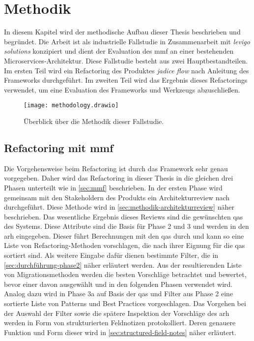 \chapter{Methodik}
\label{chap:methodik}

In diesem Kapitel wird der methodische Aufbau dieser Thesis beschrieben und begründet.
Die Arbeit ist als industrielle Fallstudie in Zusammenarbeit mit \emph{levigo solutions} konzipiert und dient der Evaluation des \gls{mmf} an einer bestehenden Microservices-Architektur.
Diese Fallstudie besteht aus zwei Hauptbestandteilen.
Im ersten Teil wird ein Refactoring des Produktes \emph{jadice flow} nach Anleitung des Frameworks durchgeführt.
Im zweiten Teil wird das Ergebnis dieses Refactorings verwendet, um eine Evaluation des Frameworks und Werkzeugs abzuschließen.

\begin{figure}[!ht]
	\centering
	\texttt{[image: methodology.drawio]}
	\caption[Überblick über die Methodik dieser Fallstudie]{
		Überblick über die Methodik dieser Fallstudie.
	}
	\label{fig:methodology}
\end{figure}

\section{Refactoring mit \gls{mmf}}

Die Vorgehensweise beim Refactoring ist durch das Framework sehr genau vorgegeben.
Daher wird das Refactoring in dieser Thesis in die gleichen drei Phasen unterteilt wie in \cref{sec:mmf} beschrieben.
In der ersten Phase wird gemeinsam mit den Stakeholdern des Produkts ein Architekturreview nach  durchgeführt.
Diese Methode wird in \cref{sec:methodik-architekturreview} näher beschrieben.
Das wesentliche Ergebnis dieses Reviews sind die gewünschten \glspl{qa} des Systems.
Diese Attribute sind die Basis für Phase 2 und 3 und werden in den \gls{arh} eingegeben.
Dieser führt Berechnungen mit den \glspl{qa} durch und kann so eine Liste von Refactoring-Methoden vorschlagen, die nach ihrer Eignung für die \glspl{qa} sortiert sind.
Als weitere Eingabe dafür dienen bestimmte Filter, die in \cref{sec:durchführung-phase2} näher erläutert werden.
Aus der resultierenden Liste von Migrationsmethoden werden die besten Vorschläge betrachtet und bewertet, bevor einer davon ausgewählt und in den folgenden Phasen verwendet wird.
Analog dazu wird in Phase 3a auf Basis der \glspl{qa} und Filter aus Phase 2 eine sortierte Liste von Patterns und Best Practices vorgeschlagen.
Das Vorgehen bei der Auswahl der Filter sowie die spätere Inspektion der Vorschläge des \gls{arh} werden in Form von strukturierten Feldnotizen protokolliert.
Deren genauere Funktion und Form dieser wird in \cref{sec:structured-field-notes} näher erläutert.

